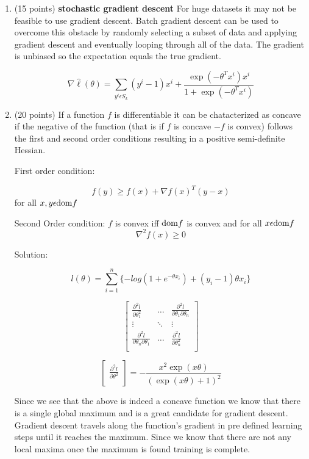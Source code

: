 \documentclass[twoside,10pt]{article}
\begin{document}
\begin{enumerate}
\begin{enumerate}
\item (15 points) {\bf stochastic gradient descent}
For huge datasets it may not be feasible to use gradient descent.  Batch gradient descent can be used to overcome this obstacle by randomly selecting a subset of data and applying gradient descent and eventually looping through all of the data.  The gradient is unbiased so the expectation equals the true gradient.

$$\nabla \hat{\ell} (\theta)=\sum_{y^i\epsilon S_k}(y^i-1)x^i+\frac{\exp(-\theta^Tx^i)x^i}{1+\exp(-\theta^Tx^i)}$$
 
\item (20 points) If a function $f$ is differentiable it can be chatacterized as concave if the negative of the function (that is if $f$ is concave $-f$ is convex) follows the first and second order conditions resulting in a positive semi-definite Hessian.

First order condition:

$$f(y) \geq f(x) + \nabla f(x) ^T (y-x)$$
for all $x,y \epsilon {\rm dom} f$

Second Order condition:
$f$ is convex iff $ {\rm dom} f$ is convex and for all $x \epsilon {\rm dom} f$
$$\nabla^2 f(x) \geq 0$$

  
Solution:

$$l(\theta) = \sum_{i=1}^n \{ -log\left( 1 + e^{-\theta x_i} \right) + \left( y_i - 1 \right)\theta x_i \}$$

$$\begin{bmatrix}
 \frac{\partial^2 l}{\partial \theta_1^2} & \dots & \frac{\partial^2 l}{\partial \theta_1 \partial \theta_n} \\
 \vdots & \ddots & \vdots \\
 \frac{\partial^2 l}{\partial \theta_n \partial \theta_1} & \dots & \frac{\partial^2 l}{\partial \theta_ n^2} \\
\end{bmatrix}
$$

$$
\begin{bmatrix}
\frac{\partial^2 l}{\partial \theta^2} \\
\end{bmatrix}
=-\frac{x^2 \exp(x \theta)}{(\exp(x \theta)+1)^2}
$$

Since we see that the above is indeed a concave function we know that there is a single global maximum and is a great candidate for gradient descent.  Gradient descent travels along the function's gradient in pre defined learning steps until it reaches the maximum.  Since we know that there are not any local maxima once the maximum is found training is complete.


\end{enumerate}
\end{enumerate}
\end{document}
